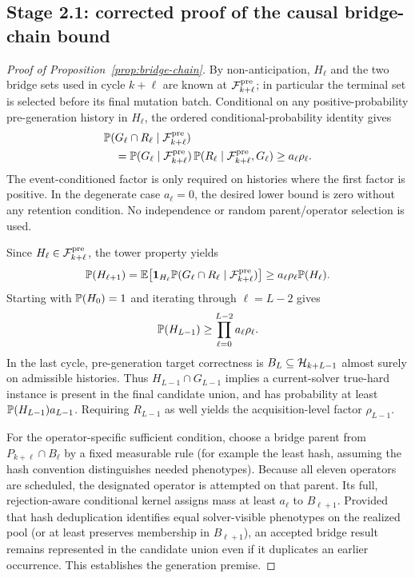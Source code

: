 \subsection{Stage 2.1: corrected proof of the causal bridge-chain bound}
\begin{proof}[Proof of Proposition~\ref{prop:bridge-chain}]
By non-anticipation, $H_\ell$ and the two bridge sets used in cycle
$k+\ell$ are known at $\mathcal F_{k+\ell}^{\rm pre}$; in particular the
terminal set is selected before its final mutation batch. Conditional on
any positive-probability pre-generation history in $H_\ell$, the ordered
conditional-probability identity gives
\begin{align*}
 &\mathbb{P}(G_\ell\cap R_\ell\mid\mathcal F_{k+\ell}^{\rm pre})\\
 &\quad=
 \mathbb{P}(G_\ell\mid\mathcal F_{k+\ell}^{\rm pre})\,
 \mathbb{P}(R_\ell\mid\mathcal F_{k+\ell}^{\rm pre},G_\ell)
 \geq a_\ell\rho_\ell.
\end{align*}
The event-conditioned factor is only required on histories where the first
factor is positive. In the degenerate case $a_\ell=0$, the desired lower
bound is zero without any retention condition. No independence or
random parent/operator selection is used.

Since $H_\ell\in\mathcal F_{k+\ell}^{\rm pre}$, the tower property yields
\[
 \mathbb{P}(H_{\ell+1})
 =\mathbb{E}\!\left[\mathbf 1_{H_\ell}
       \mathbb{P}(G_\ell\cap R_\ell\mid
                     \mathcal F_{k+\ell}^{\rm pre})\right]
 \geq a_\ell\rho_\ell\mathbb{P}(H_\ell).
\]
Starting with $\mathbb{P}(H_0)=1$ and iterating through $\ell=L-2$
gives
\[
 \mathbb{P}(H_{L-1})\geq
       \prod_{\ell=0}^{L-2}a_\ell\rho_\ell.
\]
In the last cycle, pre-generation target correctness is
$B_L\subseteq\mathcal{H}_{k+L-1}$ almost surely on admissible histories.
Thus $H_{L-1}\cap G_{L-1}$ implies a current-solver true-hard instance
is present in the final candidate union, and has probability at least
$\mathbb{P}(H_{L-1})a_{L-1}$. Requiring $R_{L-1}$ as well yields the
acquisition-level factor $\rho_{L-1}$.

For the operator-specific sufficient condition, choose a bridge parent
from $P_{k+\ell}\cap B_\ell$ by a fixed measurable rule (for example the
least hash, assuming the hash convention distinguishes needed
phenotypes). Because all eleven operators are scheduled, the designated
operator is attempted on that parent. Its full, rejection-aware
conditional kernel assigns mass at least $a_\ell$ to $B_{\ell+1}$.
Provided that hash deduplication identifies equal solver-visible
phenotypes on the realized pool (or at least preserves membership in
$B_{\ell+1}$), an accepted bridge result remains represented in the
candidate union even if it duplicates an earlier occurrence.
This establishes the generation premise.


\end{proof}
